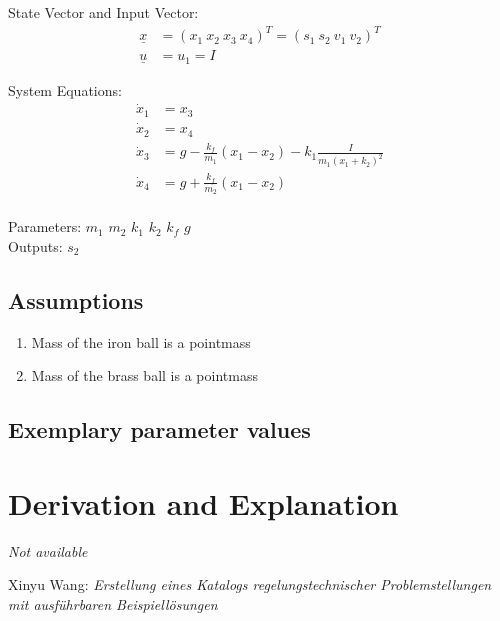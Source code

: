 \documentclass[10pt,a4paper]{article}
\begin{document}
	State Vector and Input Vector:
	\begin{align*}
		\underline{x} &= (x_1 \ x_2 \ x_3 \ x_4)^T = (s_1 \ s_2 \ v_1 \ v_2)^T \\
		\underline{u} &= u_1 = I
	\end{align*}
	
	\noindent System Equations:			
	\begin{subequations}
	\begin{align}
		\dot{x}_1 &= x_3 \\
		\dot{x}_2 &= x_4 \\
		\dot{x}_3 &= g - \frac{k_f}{m_1}(x_1 - x_2) - k_1\frac{I}{m_1(x_1+k_2)^2}  \\
		\dot{x}_4 &= g + \frac{k_f}{m_2}(x_1 - x_2) \\
	\end{align}
	\end{subequations}

	\noindent
	Parameters: $m_1$ $m_2$ $k_1$ $k_2$ $k_f$ $g$  %
	\\
	Outputs: $s_2$ %
	
	
	\subsection{Assumptions} %
		\begin{enumerate} %
			\item Mass of the iron ball is a pointmass
			\item Mass of the brass ball is a pointmass
		\end{enumerate}
	
	
	\subsection{Exemplary parameter values}
	

	
	\section{Derivation and Explanation} %
	
	\textit{Not available}
	
	
	\begin{thebibliography}{10}		
		Xinyu Wang: 
		\textit{Erstellung eines Katalogs regelungstechnischer Problemstellungen mit ausführbaren Beispiellösungen}
	\end{thebibliography}
\end{document}
